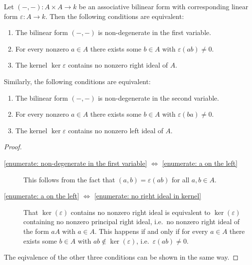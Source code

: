 \begin{lemma}
  \label{proposition: nondegenerate for linear forms}
  Let $(-,-) \colon A \times A \to k$ be an associative bilinear form with corresponding linear form $\varepsilon \colon A \to k$.
  Then the following conditions are equivalent:
  \begin{enumerate}
    \item
      \label{enumerate: non-degenerate in the first variable}
      The bilinear form $(-,-)$ is non-degenerate in the first variable.
    \item
      \label{enumerate: a on the left}
      For every nonzero $a \in A$ there exists some $b \in A$ with $\varepsilon(ab) \neq 0$.
    \item
      \label{enumerate: no right ideal in kernel}
      The kernel $\ker \varepsilon$ contains no nonzero right ideal of $A$.
  \end{enumerate}
  Similarly, the following conditions are equivalent:
  \begin{enumerate}
    \item
      The bilinear form $(-,-)$ is non-degenerate in the second variable.
    \item
      For every nonzero $a \in A$ there exists some $b \in A$ with $\varepsilon(ba) \neq 0$.
    \item
      The kernel $\ker \varepsilon$ contains no nonzero left ideal of $A$.
  \end{enumerate}
\end{lemma}


\begin{proof}
  \leavevmode
  \begin{description}
    \item[\ref*{enumerate: non-degenerate in the first variable} $\iff$ \ref*{enumerate: a on the left}]
      This follows from the fact that $(a,b) = \varepsilon(ab)$ for all $a, b \in A$.
    \item[\ref*{enumerate: a on the left} $\iff$ \ref*{enumerate: no right ideal in kernel}]
      That $\ker(\varepsilon)$ contains no nonzero right ideal is equivalent to $\ker(\varepsilon)$ containing no nonzero principal right ideal, i.e.\ no nonzero right ideal of the form $a A$ with $a \in A$.
      This happens if and only if for every $a \in A$ there exists some $b \in A$ with $ab \notin \ker(\varepsilon)$, i.e.\ $\varepsilon(ab) \neq 0$.
  \end{description}
  The eqivalence of the other three conditions can be shown in the same way.
\end{proof}


